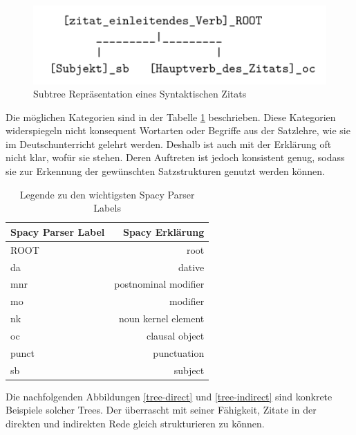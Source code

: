 \begin{figure}[H]
	\begin{center}
        \centering
		\includegraphics[width=0.6\linewidth]{./images/structure_citation.png}
	\end{center}
\caption{Subtree Repräsentation eines Syntaktischen Zitats}
\label{tree-general}
\end{figure}

Die möglichen Kategorien sind in der Tabelle \ref{legend-spacy-parsers} beschrieben. Diese Kategorien
widerspiegeln nicht konsequent Wortarten oder Begriffe aus der Satzlehre, wie sie im Deutschunterricht
gelehrt werden. Deshalb ist auch mit der Erklärung oft nicht klar, wofür sie stehen. Deren Auftreten
ist jedoch konsistent genug, sodass sie zur Erkennung der gewünschten Satzstrukturen genutzt werden
können.

\begin{table}[H]
    \centering
    \begin{tabular}{|l|r|}
        \hline
        \textbf{Spacy Parser Label} & \textbf{Spacy Erklärung} \\
        \hline
        \hline
        ROOT & root \\
        \hline
        da & dative \\
        \hline
        mnr & postnominal modifier \\
        \hline
        mo & modifier \\
        \hline
        nk & noun kernel element \\
        \hline
        oc & clausal object \\
        \hline
        punct & punctuation \\
        \hline
        sb & subject \\
        \hline
    \end{tabular}
    \caption{Legende zu den wichtigsten Spacy Parser Labels}
    \label{legend-spacy-parsers}
\end{table}

Die nachfolgenden Abbildungen \ref{tree-direct} und \ref{tree-indirect} sind konkrete Beispiele solcher
Trees. Der   überrascht mit seiner Fähigkeit, Zitate in der direkten und
indirekten Rede gleich strukturieren zu können.

